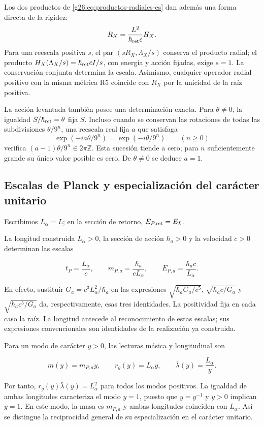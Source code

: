 Los dos productos de \eqref{g26:eq:productos-radiales-es} dan además una
forma directa de la rigidez:
\begin{equation}
 R_X=\frac{L^2}{\hbar_{\rm ret}c}H_X.
 \label{g26:eq:proporcion-operadores-es}
\end{equation}
Para una reescala positiva \(s\), el par
\((sR_X,\Lambda_X/s)\) conserva el producto radial; el producto
\(H_X(\Lambda_X/s)=\hbar_{\rm ret}cI/s\), con energía y acción
fijadas, exige \(s=1\). La conservación conjunta determina la escala.
Asimismo, cualquier operador radial positivo con la misma métrica R5
coincide con \(R_X\) por la unicidad de la raíz positiva.

La acción levantada también posee una determinación exacta. Para
\(\theta\ne0\), la igualdad \(S/\hbar_{\rm ret}=\theta\) fija \(S\).
Incluso cuando se conservan las rotaciones de todas las subdivisiones
\(\theta/9^n\), una reescala real fija \(a\) que satisfaga
\[
 \exp(-ia\theta/9^n)=\exp(-i\theta/9^n)
 \qquad(n\geq0)
\]
verifica \((a-1)\theta/9^n\in2\pi\mathbb Z\). Esta sucesión tiende
a cero; para \(n\) suficientemente grande su único valor posible es
cero. De \(\theta\ne0\) se deduce \(a=1\).

\subsection{Escalas de Planck y especialización del carácter unitario}

Escribimos \(L_\alpha=L\); en la sección de retorno, \(E_{P,\rm ret}=E_L\).

La longitud construida $L_\alpha>0$, la sección de acción $\hbar_a>0$ y la
velocidad $c>0$ determinan las escalas

\[
t_P=\frac{L_\alpha}{c},\qquad
m_{P,a}=\frac{\hbar_a}{cL_\alpha},\qquad
E_{P,a}=\frac{\hbar_a c}{L_\alpha}.
\]

En efecto, sustituir $G_a=c^3L_\alpha^2/\hbar_a$ en las expresiones
$\sqrt{\hbar_aG_a/c^5}$, $\sqrt{\hbar_ac/G_a}$ y
$\sqrt{\hbar_ac^5/G_a}$ da, respectivamente, esas tres identidades.
La positividad fija en cada caso la raíz. La longitud antecede al
reconocimiento de estas escalas; sus expresiones convencionales son
identidades de la realización ya construida.

Para un modo de carácter $y>0$, las lecturas másica y longitudinal son

\[
m(y)=m_{P,a}y,\qquad r_g(y)=L_\alpha y,\qquad
\bar\lambda(y)=\frac{L_\alpha}{y}.
\]

Por tanto, $r_g(y)\bar\lambda(y)=L_\alpha^2$ para todos los modos
positivos. La igualdad de ambas longitudes caracteriza el modo $y=1$,
puesto que $y=y^{-1}$ y $y>0$ implican $y=1$. En este modo, la masa es
$m_{P,a}$ y ambas longitudes coinciden con $L_\alpha$. Así se distingue
la reciprocidad general de su especialización en el carácter unitario.

